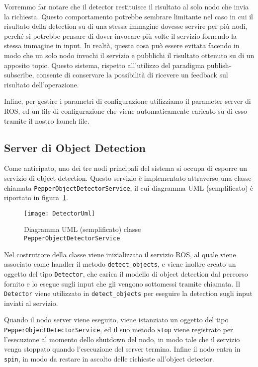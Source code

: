 Vorremmo far notare che il detector restituisce il risultato al solo nodo che invia la richiesta. Questo comportamento potrebbe sembrare limitante nel caso in cui il risultato della detection su di una stessa immagine dovesse servire per più nodi, perché si potrebbe pensare di dover invocare più volte il servizio fornendo la stessa immagine in input. In realtà, questa cosa può essere evitata facendo in modo che un solo nodo invochi il servizio e pubblichi il risultato ottenuto su di un apposito topic. Questo sistema, rispetto all'utilizzo del paradigma publish-subscribe, consente di conservare la possibilità di ricevere un feedback sul risultato dell'operazione. 

Infine, per gestire i parametri di configurazione utilizziamo il parameter server di ROS, ed un file di configurazione che viene automaticamente caricato su di esso tramite il nostro launch file. 

\subsection{Server di Object Detection}

Come anticipato, uno dei tre nodi principali del sistema si occupa di esporre un servizio di object detection. 
Questo servizio è implementato attraverso una classe chiamata \verb|PepperObjectDetectorService|, il cui diagramma UML (semplificato) è riportato in figura~\ref{fig:detector_uml}.

\begin{figure}[ht]
	\centering
	\texttt{[image: DetectorUml]}
	\caption{Diagramma UML (semplificato) classe \texttt{PepperObjectDetectorService}}
	\label{fig:detector_uml}
\end{figure}

Nel costruttore della classe viene inizializzato il servizio ROS, al quale viene associato come handler il metodo \verb|detect_objects|, e viene inoltre creato un oggetto del tipo \verb|Detector|, che carica il modello di object detection dal percorso fornito e lo esegue sugli input che gli vengono sottomessi tramite chiamata. Il \verb|Detector| viene utilizzato in \verb|detect_objects| per eseguire la detection sugli input inviati al servizio.

Quando il nodo server viene eseguito, viene istanziato un oggetto del tipo 
\verb|PepperObjectDetectorService|, ed il suo metodo \verb|stop| viene registrato per l'esecuzione al momento dello shutdown del nodo, in modo tale che il servizio venga stoppato quando l'esecuzione del server termina. 
Infine il nodo entra in \verb|spin|, in modo da restare in ascolto delle richieste all'object detector.

